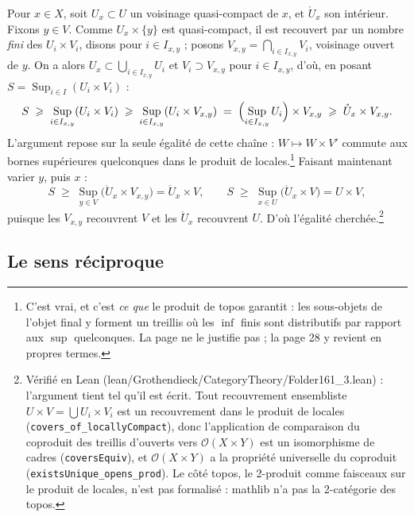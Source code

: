 \documentclass[11pt,a4paper]{article}
\begin{document}
Pour $x \in X$, soit $U_{x} \subset U$ un voisinage quasi-compact de $x$, et
$\mathring{U}_{x}$ son intérieur. Fixons $y \in V$. Comme $U_{x} \times \{y\}$
est quasi-compact, il est recouvert par un nombre \emph{fini} des
$U_{i} \times V_{i}$, disons pour $i \in I_{x,y}$ ; posons
$V_{x,y} = \bigcap_{i \in I_{x,y}} V_{i}$, voisinage ouvert de $y$. On a alors
$U_{x} \subset \bigcup_{i \in I_{x,y}} U_{i}$ et $V_{i} \supset V_{x,y}$ pour
$i \in I_{x,y}$, d'où, en posant
$S = \operatorname*{Sup}_{i \in I}(U_{i} \times V_{i})$ :
\[
S \;\geqslant\; \operatorname*{Sup}_{i \in I_{x,y}}(U_{i} \times V_{i})
\;\geqslant\; \operatorname*{Sup}_{i \in I_{x,y}}(U_{i} \times V_{x,y})
\;=\; \Bigl(\operatorname*{Sup}_{i \in I_{x,y}} U_{i}\Bigr) \times V_{x,y}
\;\geqslant\; \mathring{U}_{x} \times V_{x,y}.
\]
L'argument repose sur la seule égalité de cette chaîne :
$W \mapsto W \times V'$ commute aux bornes supérieures quelconques dans le
produit de locales.\footnote{C'est vrai, et c'est \emph{ce que} le
produit de topos garantit : les sous-objets de l'objet final y forment un
treillis où les $\inf$ finis sont distributifs par rapport aux $\sup$
quelconques. La page ne le justifie pas ; la page 28 y revient en propres
termes.} Faisant maintenant varier $y$, puis $x$ :
\[
S \;\geqslant\; \operatorname*{Sup}_{y \in V}
\bigl(\mathring{U}_{x} \times V_{x,y}\bigr)
= \mathring{U}_{x} \times V,
\qquad
S \;\geqslant\; \operatorname*{Sup}_{x \in U}
\bigl(\mathring{U}_{x} \times V\bigr) = U \times V,
\]
puisque les $V_{x,y}$ recouvrent $V$ et les $\mathring{U}_{x}$ recouvrent $U$.
D'où l'égalité cherchée.\footnote{Vérifié en Lean
(lean/Grothendieck/CategoryTheory/Folder161\_3.lean) : l'argument tient tel qu'il est écrit.
Tout recouvrement ensembliste $U \times V = \bigcup U_i \times V_i$ est un
recouvrement dans le produit de locales (\texttt{covers\_of\_locallyCompact}),
donc l'application de comparaison du coproduit des treillis d'ouverts vers
$\mathcal{O}(X \times Y)$ est un isomorphisme de cadres
(\texttt{coversEquiv}), et $\mathcal{O}(X \times Y)$ a la propriété
universelle du coproduit (\texttt{existsUnique\_opens\_prod}). Le côté topos,
le 2-produit comme faisceaux sur le produit de locales, n'est pas formalisé :
mathlib n'a pas la 2-catégorie des topos.}

\subsection*{Le sens réciproque}
\end{document}
